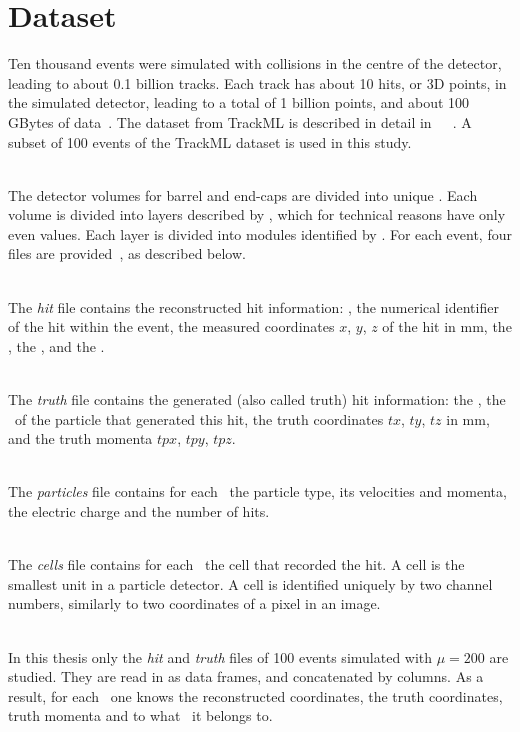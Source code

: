 \section{Dataset}

Ten thousand events were simulated with collisions in the centre of the detector, leading to about 0.1 billion tracks. Each track has about 10 hits, or 3D points, in the simulated detector, leading to a total of 1 billion points, and about 100 GBytes of data~\cite{TrackMLPPTAfter2}. The dataset from TrackML is described in detail in~\cite{TrackMLPaperAccuracyPhase}~\cite{TrackMLPaper}~\cite{TrackMLPaperHAL}. A subset of 100 events of the TrackML dataset is used in this study.

\ \\The detector volumes for barrel and end-caps are divided into unique \volumeID. Each volume is divided into layers described by \layerID, which for technical reasons have only even values. Each layer is divided into modules identified by \moduleID. For each event, four files are provided~\cite{TrackMLPaper}, as described below.

\ \\The \emph{hit} file contains the reconstructed hit information: \hitID, the numerical identifier of the hit within the event, the measured coordinates $x$, $y$, $z$ of the hit in mm, the \volumeID, the \layerID, and the \moduleID.

\ \\The \emph{truth} file contains the generated (also called truth) hit information: the \hitID, the \particleID~of the particle that generated this hit, the truth coordinates $tx$, $ty$, $tz$ in mm, and the truth momenta $tpx$, $tpy$, $tpz$. 

\ \\The \emph{particles} file contains for each \particleID~the particle type, its velocities and momenta, the electric charge and the number of hits.

\ \\The \emph{cells} file contains for each \hitID~the cell that recorded the hit. A cell is the smallest unit in a particle detector. A cell is identified uniquely by two channel numbers, similarly to two coordinates of a pixel in an image. 

\ \\In this thesis only the \emph{hit} and \emph{truth} files of 100 events simulated with $\mu=200$ are studied. They are read in as data frames, and concatenated by columns. As a result, for each \hitID~one knows the reconstructed coordinates, the truth coordinates, truth momenta and to what \particleID~it belongs to. 

